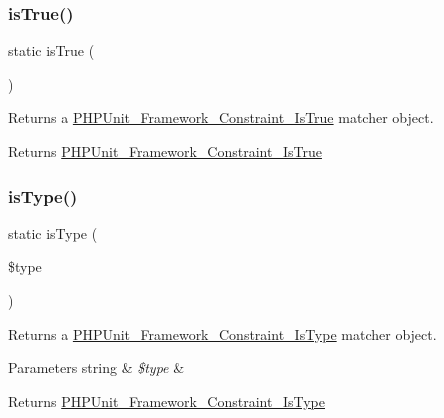 \subsubsection{\texorpdfstring{is\+True()}{isTrue()}}
{\footnotesize\ttfamily static is\+True (\begin{DoxyParamCaption}{ }\end{DoxyParamCaption})\hspace{0.3cm}{\ttfamily [static]}}

Returns a \mbox{\hyperlink{class_p_h_p_unit___framework___constraint___is_true}{P\+H\+P\+Unit\+\_\+\+Framework\+\_\+\+Constraint\+\_\+\+Is\+True}} matcher object.

\begin{DoxyReturn}{Returns}
\mbox{\hyperlink{class_p_h_p_unit___framework___constraint___is_true}{P\+H\+P\+Unit\+\_\+\+Framework\+\_\+\+Constraint\+\_\+\+Is\+True}} 
\end{DoxyReturn}
\mbox{\label{class_p_h_p_unit___framework___assert_a5ce9b7cd8339182d239a947cabcc9059}} 
\subsubsection{\texorpdfstring{is\+Type()}{isType()}}
{\footnotesize\ttfamily static is\+Type (\begin{DoxyParamCaption}\item[{}]{\$type }\end{DoxyParamCaption})\hspace{0.3cm}{\ttfamily [static]}}

Returns a \mbox{\hyperlink{class_p_h_p_unit___framework___constraint___is_type}{P\+H\+P\+Unit\+\_\+\+Framework\+\_\+\+Constraint\+\_\+\+Is\+Type}} matcher object.


\begin{DoxyParams}[1]{Parameters}
string & {\em \$type} & \\
\hline
\end{DoxyParams}
\begin{DoxyReturn}{Returns}
\mbox{\hyperlink{class_p_h_p_unit___framework___constraint___is_type}{P\+H\+P\+Unit\+\_\+\+Framework\+\_\+\+Constraint\+\_\+\+Is\+Type}} 
\end{DoxyReturn}
\mbox{\label{class_p_h_p_unit___framework___assert_a849d18b134751834110a62dc298ec945}} 
